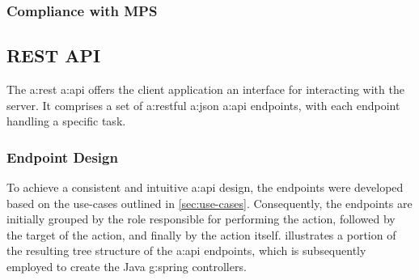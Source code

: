 \subsubsection{Compliance with MPS}\label{sec:cs-data-mps}




\pagebreak

\subsection{REST API}\label{sec:cs-api}

The \gls{a:rest} \gls{a:api} offers the client application an interface for interacting with the server. It comprises a set of \gls{a:rest}ful \gls{a:json} \gls{a:api} endpoints, with each endpoint handling a specific task.

\subsubsection{Endpoint Design}\label{sec:cs-api-endpoints}

To achieve a consistent and intuitive \gls{a:api} design, the endpoints were developed based on the use-cases outlined in \cref{sec:use-cases}. Consequently, the endpoints are initially grouped by the role responsible for performing the action, followed by the target of the action, and finally by the action itself.  illustrates a portion of the resulting tree structure of the \gls{a:api} endpoints, which is subsequently employed to create the Java \gls{g:spring} controllers.

